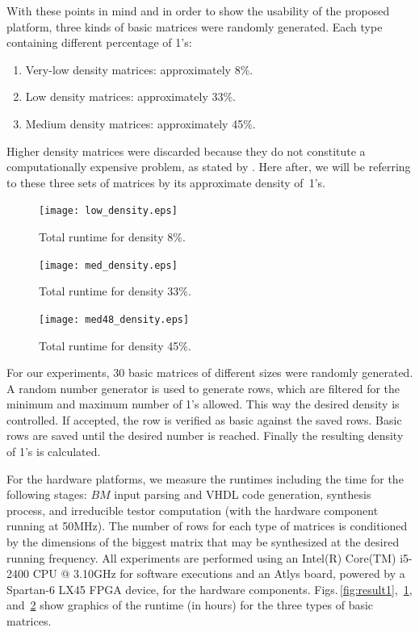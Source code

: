\documentclass[authoryear,preprint,review,12pt]{elsarticle}
\begin{document}
With these points in mind and in order to show the usability of the proposed platform, 
three kinds of basic matrices were randomly generated. Each type containing different percentage of 1's: 
\begin{enumerate}
	\item Very-low density matrices: approximately 8\%.
	\item Low density matrices: approximately 33\%.
	\item Medium density matrices: approximately 45\%.
\end{enumerate}

Higher density matrices were discarded because they do not constitute a computationally expensive problem, 
as stated by \cite{R21}. Here after, we will be referring to these three sets of matrices by its 
approximate density of~1's.

\begin{figure}[htb]
\centering
\begin{minipage}{.5\textwidth}
  \centering
   \texttt{[image: low\_density.eps]}
  \caption{Total runtime for density 8\%.}
  \label{fig:result1}
\end{minipage}%
\begin{minipage}{.5\textwidth}
  \centering
   \texttt{[image: med\_density.eps]}
  \caption{Total runtime for density 33\%.}
  \label{fig:result2}
\end{minipage}
\end{figure}

\begin{figure}[htb]
    \begin{center}
       \texttt{[image: med48\_density.eps]}
    \end{center}
\caption{Total runtime for density 45\%.}
\label{fig:result3}
\end{figure}


For our experiments, 30 basic matrices of different sizes were randomly generated. 
A random number generator is used to generate rows, which are
filtered for the minimum and maximum number of 1's allowed. This way the desired density is
controlled. If accepted, the row is verified as basic against the saved rows. Basic rows 
are saved until the desired number is reached. Finally the resulting 
density of 1's is calculated.

For the hardware platforms, we measure the runtimes including the time for the following stages: $BM$ input parsing 
and VHDL code generation, synthesis process, and irreducible testor computation (with the hardware 
component running at 50MHz). The number of rows for each type of matrices is conditioned by the dimensions of 
the biggest matrix that may be synthesized at the desired running frequency.
All experiments are performed using an Intel(R) Core(TM) i5-2400 CPU @ 3.10GHz for software executions and 
an Atlys board, powered by a Spartan-6 LX45 FPGA device, for the hardware components.
Figs.\,\ref{fig:result1}, \,\ref{fig:result2}, and \,\ref{fig:result3} show graphics of the runtime (in hours) 
for the three types of basic matrices. 
\end{document}
